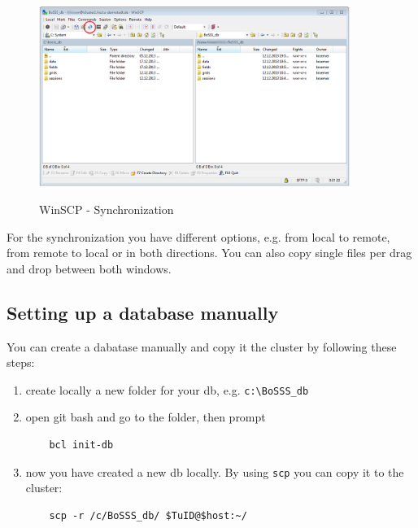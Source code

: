 \documentclass[11pt,twoside,a4paper]{fdyartcl}
\begin{document}
\begin{figure}[t] %
  \begin{centering}
  \includegraphics[width=0.9\textwidth]{Figures/winscp_sync.png}\\
  \end{centering}
  \caption{WinSCP - Synchronization}\label{fig:winscp_sync}
\end{figure} %
For the synchronization you have different options, e.g. from local to remote, from remote to local or in both directions.
You can also copy single files per drag and drop between both windows.

\subsection{Setting up a database manually}
\label{sec:setup_db}
You can create a dabatase manually and copy it the cluster by following these steps:
\begin{enumerate}
	\item create locally a new folder for your db, e.g. \verb|c:\BoSSS_db|
	\item open git bash and go to the folder, then prompt
	\begin{verbatim}
	bcl init-db
	\end{verbatim}
	\item now you have created a new db locally. By using \verb|scp| you can copy it to the cluster:
	\begin{verbatim}
	scp -r /c/BoSSS_db/ $TuID@$host:~/
	\end{verbatim}
\end{enumerate}
\end{document}
